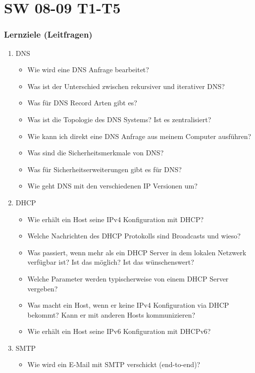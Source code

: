 \part{SW 08-09 T1-T5}
\section{Lernziele (Leitfragen)}
\begin{enumerate}
    \item DNS
    \begin{itemize}
        \item Wie wird eine DNS Anfrage bearbeitet?
        \item Was ist der Unterschied zwischen rekursiver und iterativer DNS?
        \item Was für DNS Record Arten gibt es?
        \item Was ist die Topologie des DNS Systems? Ist es zentralisiert?
        \item Wie kann ich direkt eine DNS Anfrage aus meinem Computer ausführen?
        \item Was sind die Sicherheitsmerkmale von DNS?
        \item Was für Sicherheitserweiterungen gibt es für DNS?
        \item Wie geht DNS mit den verschiedenen IP Versionen um?
    \end{itemize}
    \item DHCP
    \begin{itemize}
        \item Wie erhält ein Host seine IPv4 Konfiguration mit DHCP?
        \item Welche Nachrichten des DHCP Protokolls sind Broadcasts und wieso?
        \item Was passiert, wenn mehr als ein DHCP Server in dem lokalen Netzwerk verfügbar ist? Ist das möglich? Ist das wünschenswert?
        \item Welche Parameter werden typischerweise von einem DHCP Server vergeben?
        \item Was macht ein Host, wenn er keine IPv4 Konfiguration via DHCP bekommt? Kann er mit anderen Hosts kommunizieren?
        \item Wie erhält ein Host seine IPv6 Konfiguration mit DHCPv6?
    \end{itemize}
    \item SMTP
    \begin{itemize}
        \item Wie wird ein E-Mail mit SMTP verschickt (end-to-end)?

\end{itemize}
\end{enumerate}
